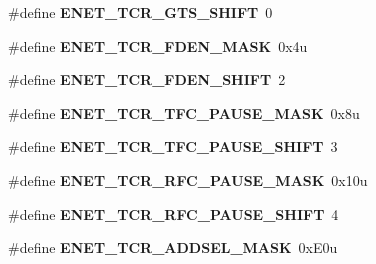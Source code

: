 \begin{DoxyCompactItemize}
\item 
\#define {\bfseries E\+N\+E\+T\+\_\+\+T\+C\+R\+\_\+\+G\+T\+S\+\_\+\+S\+H\+I\+FT}~0\hypertarget{group__ENET__Register__Masks_ga6f1db14f8c66c67580cb518d13f99cc5}{}\label{group__ENET__Register__Masks_ga6f1db14f8c66c67580cb518d13f99cc5}

\item 
\#define {\bfseries E\+N\+E\+T\+\_\+\+T\+C\+R\+\_\+\+F\+D\+E\+N\+\_\+\+M\+A\+SK}~0x4u\hypertarget{group__ENET__Register__Masks_gadf5843a438d25920ade38488aa66a81c}{}\label{group__ENET__Register__Masks_gadf5843a438d25920ade38488aa66a81c}

\item 
\#define {\bfseries E\+N\+E\+T\+\_\+\+T\+C\+R\+\_\+\+F\+D\+E\+N\+\_\+\+S\+H\+I\+FT}~2\hypertarget{group__ENET__Register__Masks_ga65366ef60776e87cc2a287656568fb8e}{}\label{group__ENET__Register__Masks_ga65366ef60776e87cc2a287656568fb8e}

\item 
\#define {\bfseries E\+N\+E\+T\+\_\+\+T\+C\+R\+\_\+\+T\+F\+C\+\_\+\+P\+A\+U\+S\+E\+\_\+\+M\+A\+SK}~0x8u\hypertarget{group__ENET__Register__Masks_ga71a1167639f6bec0334adb16cdc8e049}{}\label{group__ENET__Register__Masks_ga71a1167639f6bec0334adb16cdc8e049}

\item 
\#define {\bfseries E\+N\+E\+T\+\_\+\+T\+C\+R\+\_\+\+T\+F\+C\+\_\+\+P\+A\+U\+S\+E\+\_\+\+S\+H\+I\+FT}~3\hypertarget{group__ENET__Register__Masks_ga100df2882bc10658b602c3b2f90c0ed3}{}\label{group__ENET__Register__Masks_ga100df2882bc10658b602c3b2f90c0ed3}

\item 
\#define {\bfseries E\+N\+E\+T\+\_\+\+T\+C\+R\+\_\+\+R\+F\+C\+\_\+\+P\+A\+U\+S\+E\+\_\+\+M\+A\+SK}~0x10u\hypertarget{group__ENET__Register__Masks_ga58df374de0ed871ab2ca078de9dbea40}{}\label{group__ENET__Register__Masks_ga58df374de0ed871ab2ca078de9dbea40}

\item 
\#define {\bfseries E\+N\+E\+T\+\_\+\+T\+C\+R\+\_\+\+R\+F\+C\+\_\+\+P\+A\+U\+S\+E\+\_\+\+S\+H\+I\+FT}~4\hypertarget{group__ENET__Register__Masks_ga78f8c9e05c33991ec790011804fee80d}{}\label{group__ENET__Register__Masks_ga78f8c9e05c33991ec790011804fee80d}

\item 
\#define {\bfseries E\+N\+E\+T\+\_\+\+T\+C\+R\+\_\+\+A\+D\+D\+S\+E\+L\+\_\+\+M\+A\+SK}~0x\+E0u\hypertarget{group__ENET__Register__Masks_ga3bfa977a883b14b1f86c879e0a31ef5b}{}\label{group__ENET__Register__Masks_ga3bfa977a883b14b1f86c879e0a31ef5b}


\end{DoxyCompactItemize}
